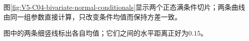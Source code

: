 \documentclass[UTF8,a4paper,11pt,openany]{ctexbook}
\begin{document}
\setcounter{page}{806}
\setcounter{chapter}{33}
\setcounter{figure}{5}
\pagestyle{headings}
图\ref{fig:V5-C04-bivariate-normal-conditionals}显示两个正态满条件切片；两条曲线由同一组参数直接计算，只改变条件均值而保持方差一致。

\FloatBarrier
图中的两条细竖线标出各自均值；它们之间的水平距离正好为$0.15$。
\end{document}
